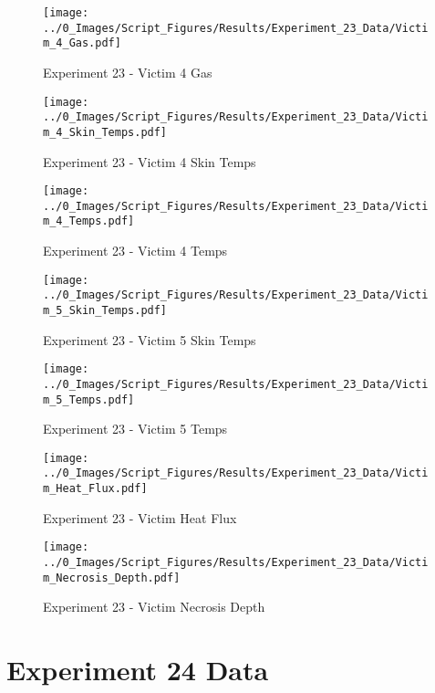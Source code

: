 	\clearpage

	\begin{figure}[H]
		\centering
		\texttt{[image: ../0\_Images/Script\_Figures/Results/Experiment\_23\_Data/Victim\_4\_Gas.pdf]}
		\caption[]{Experiment 23 - Victim 4 Gas}
	\end{figure}
 

	\begin{figure}[H]
		\centering
		\texttt{[image: ../0\_Images/Script\_Figures/Results/Experiment\_23\_Data/Victim\_4\_Skin\_Temps.pdf]}
		\caption[]{Experiment 23 - Victim 4 Skin Temps}
	\end{figure}
 
	\clearpage

	\begin{figure}[H]
		\centering
		\texttt{[image: ../0\_Images/Script\_Figures/Results/Experiment\_23\_Data/Victim\_4\_Temps.pdf]}
		\caption[]{Experiment 23 - Victim 4 Temps}
	\end{figure}
 

	\begin{figure}[H]
		\centering
		\texttt{[image: ../0\_Images/Script\_Figures/Results/Experiment\_23\_Data/Victim\_5\_Skin\_Temps.pdf]}
		\caption[]{Experiment 23 - Victim 5 Skin Temps}
	\end{figure}
 
	\clearpage

	\begin{figure}[H]
		\centering
		\texttt{[image: ../0\_Images/Script\_Figures/Results/Experiment\_23\_Data/Victim\_5\_Temps.pdf]}
		\caption[]{Experiment 23 - Victim 5 Temps}
	\end{figure}
 

	\begin{figure}[H]
		\centering
		\texttt{[image: ../0\_Images/Script\_Figures/Results/Experiment\_23\_Data/Victim\_Heat\_Flux.pdf]}
		\caption[]{Experiment 23 - Victim Heat Flux}
	\end{figure}
 
	\clearpage

	\begin{figure}[H]
		\centering
		\texttt{[image: ../0\_Images/Script\_Figures/Results/Experiment\_23\_Data/Victim\_Necrosis\_Depth.pdf]}
		\caption[]{Experiment 23 - Victim Necrosis Depth}
	\end{figure}
 

\clearpage		\large
\section{Experiment 24 Data} \label{App:Exp24Results} 

